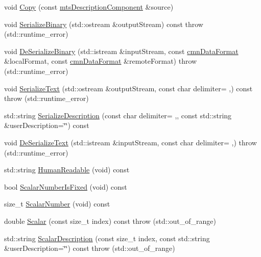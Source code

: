 \begin{DoxyCompactItemize}
\item 
void \hyperlink{classmts_description_component_ad1d9aff865eb1daed3bda3f9d8ef88cb}{Copy} (const \hyperlink{classmts_description_component}{mts\+Description\+Component} \&source)
\item 
void \hyperlink{classmts_description_component_a12686c859e5cbad6352ec8d68c2dbc4e}{Serialize\+Binary} (std\+::ostream \&output\+Stream) const   throw (std\+::runtime\+\_\+error)
\item 
void \hyperlink{classmts_description_component_a2850dacd32cba75f6c01e7fcfa1aa160}{De\+Serialize\+Binary} (std\+::istream \&input\+Stream, const \hyperlink{classcmn_data_format}{cmn\+Data\+Format} \&local\+Format, const \hyperlink{classcmn_data_format}{cmn\+Data\+Format} \&remote\+Format)  throw (std\+::runtime\+\_\+error)
\item 
void \hyperlink{classmts_description_component_acdd6d7340d4d00cbb5b2701e2483efeb}{Serialize\+Text} (std\+::ostream \&output\+Stream, const char delimiter= \textquotesingle{},\textquotesingle{}) const   throw (std\+::runtime\+\_\+error)
\item 
std\+::string \hyperlink{classmts_description_component_a55bb05d2657cd88eaba5489acb14319b}{Serialize\+Description} (const char delimiter= \textquotesingle{},\textquotesingle{}, const std\+::string \&user\+Description=\char`\"{}\char`\"{}) const 
\item 
void \hyperlink{classmts_description_component_a33a54263087078a20600405194952726}{De\+Serialize\+Text} (std\+::istream \&input\+Stream, const char delimiter= \textquotesingle{},\textquotesingle{})  throw (std\+::runtime\+\_\+error)
\item 
std\+::string \hyperlink{classmts_description_component_aec77d1543d1350ba27609d841c5b2db3}{Human\+Readable} (void) const 
\item 
bool \hyperlink{classmts_description_component_a94598766098a636192e4e9b08a57794f}{Scalar\+Number\+Is\+Fixed} (void) const 
\item 
size\+\_\+t \hyperlink{classmts_description_component_ab6c67105fd3c72538fd7bb46a7e25a16}{Scalar\+Number} (void) const 
\item 
double \hyperlink{classmts_description_component_a28f72fc4c53d6e540b355b1aa4675dfa}{Scalar} (const size\+\_\+t index) const   throw (std\+::out\+\_\+of\+\_\+range)
\item 
std\+::string \hyperlink{classmts_description_component_a07911fc4526c4d0fe5f545282dd47956}{Scalar\+Description} (const size\+\_\+t index, const std\+::string \&user\+Description=\char`\"{}\char`\"{}) const   throw (std\+::out\+\_\+of\+\_\+range)
\end{DoxyCompactItemize}
